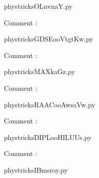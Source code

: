 
    \newcommand{\CaptionFigOLuvnaY}{<+Type your caption here+>}
    \begin{center}
        
    \end{center}
    phystricksOLuvnaY.py

    Comment : 

    \clearpage
    


    \newcommand{\CaptionFigGDSEooVtgtKw}{<+Type your caption here+>}
    \begin{center}
        
    \end{center}
    phystricksGDSEooVtgtKw.py

    Comment : 

    \clearpage
    


    \newcommand{\CaptionFigMAXkaGz}{<+Type your caption here+>}
    \begin{center}
        
    \end{center}
    phystricksMAXkaGz.py

    Comment : 

    \clearpage
    


    \newcommand{\CaptionFigRAACooAwsaVw}{<+Type your caption here+>}
    \begin{center}
        
    \end{center}
    phystricksRAACooAwsaVw.py

    Comment : 

    \clearpage
    


    \newcommand{\CaptionFigDIPLooHILUUs}{<+Type your caption here+>}
    \begin{center}
        
    \end{center}
    phystricksDIPLooHILUUs.py

    Comment : 

    \clearpage
    


    \newcommand{\CaptionFigIBmsroy}{<+Type your caption here+>}
    \begin{center}
        
    \end{center}
    phystricksIBmsroy.py

